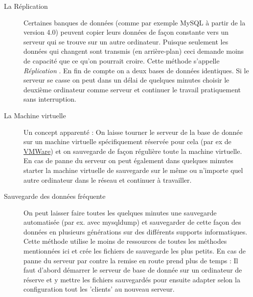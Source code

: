 \begin{description}
\item[ La Réplication ] Certaines banques de données (comme par exemple MySQL à partir de la version 4.0) peuvent copier leurs données de façon constante vers un serveur qui se trouve sur un autre ordinateur. Puisque seulement les données qui changent sont transmis (en arrière-plan) ceci demande moins de capacité que ce qu'on pourrait croire. Cette méthode s'appelle  \textit{Réplication} . En fin de compte on a deux bases de données identiques. Si le serveur se casse on peut dans un délai de quelques minutes choisir le deuxième ordinateur comme serveur et continuer le travail pratiquement sans interruption.
\item [La Machine virtuelle ] Un concept apparenté : On laisse tourner le serveur de la base de donnée sur un machine virtuelle spécifiquement réservée pour cela (par ex de \href{http://www.vmware.com/}{VMWare}) et on sauvegarde de façon régulière toute la machine virtuelle. En cas de panne du serveur on peut également dans quelques minutes starter la machine virtuelle de sauvegarde sur le même ou n'importe quel autre ordinateur dans le réseau et continuer à travailler.
\item [Sauvegarde des données fréquente ] On peut laisser faire toutes les quelques minutes une sauvegarde automatisée (par ex. avec mysqldump) et sauvegarder de cette façon des données en plusieurs générations sur des différents supports informatiques. Cette méthode utilise le moins de ressources de toutes les méthodes mentionnées ici et crée les fichiers de sauvegarde les plus petits. En cas de panne du serveur par contre la remise en route prend plus de temps : Il faut d'abord démarrer le serveur de base de donnée sur un ordinateur de réserve et y mettre les fichiers sauvegardés pour ensuite adapter selon la configuration tout les 'clients' au nouveau serveur.
\end{description}





